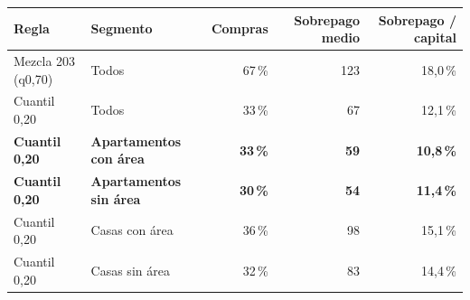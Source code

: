 \begin{tabular}{llrrr}
\toprule
Regla & Segmento & Compras & Sobrepago medio & Sobrepago / capital \\
\midrule
Mezcla 203 (q0,70) & Todos & 67\,\% & 123 & 18,0\,\% \\
Cuantil 0,20 & Todos & 33\,\% & 67 & 12,1\,\% \\
\textbf{Cuantil 0,20} & \textbf{Apartamentos con área} & \textbf{33\,\%} & \textbf{59} & \textbf{10,8\,\%} \\
\textbf{Cuantil 0,20} & \textbf{Apartamentos sin área} & \textbf{30\,\%} & \textbf{54} & \textbf{11,4\,\%} \\
Cuantil 0,20 & Casas con área & 36\,\% & 98 & 15,1\,\% \\
Cuantil 0,20 & Casas sin área & 32\,\% & 83 & 14,4\,\% \\
\bottomrule
\end{tabular}
